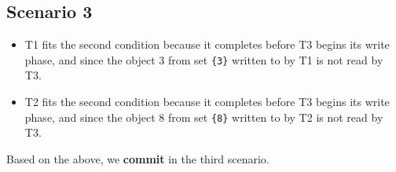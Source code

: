 \subsection{Scenario 3}

\begin{itemize}
\item T1 fits the second condition because it completes before T3 begins its write phase, and since the object 3 from set \verb|{3}| written to by T1 is not read by T3.
\item T2 fits the second condition because it completes before T3 begins its write phase, and since the object 8 from set \verb|{8}| written to by T2 is not read by T3.
\end{itemize}
Based on the above, we {\bf commit} in the third scenario.
